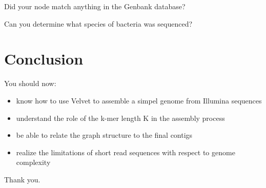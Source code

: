 \begin{questions}
Did your node match anything in the Genbank database?
\begin{answer}
\end{answer}
Can you determine what species of bacteria was sequenced?
\begin{answer}
\end{answer}
\end{questions}

\section{Conclusion}
You should now:
\begin{itemize}
\item know how to use Velvet to assemble a simpel genome from Illumina sequences
\item understand the role of the k-mer length K in the assembly process
\item be able to relate the graph structure to the final contigs
\item realize the limitations of short read sequences with respect to genome complexity
\end{itemize}
Thank you.
